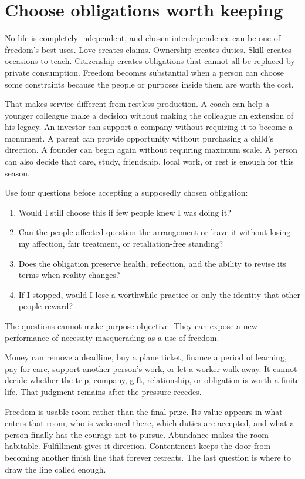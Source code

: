\section{Choose obligations worth keeping}

No life is completely independent, and chosen interdependence can be one of
freedom's best uses. Love creates claims. Ownership creates duties. Skill
creates occasions to teach. Citizenship creates obligations that cannot all be
replaced by private consumption. Freedom becomes substantial when a person can
choose some constraints because the people or purposes inside them are worth
the cost.

That makes service different from restless production. A coach can help a
younger colleague make a decision without making the colleague an extension
of his legacy. An investor can support a company without requiring it to
become a monument. A parent can provide opportunity without purchasing a
child's direction. A founder can begin again without requiring maximum scale.
A person can also decide that care, study, friendship, local work, or rest is
enough for this season.

Use four questions before accepting a supposedly chosen obligation:

\begin{enumerate}[itemsep=0.15em]
\item Would I still choose this if few people knew I was doing it?
\item Can the people affected question the arrangement or leave it without
  losing my affection, fair treatment, or retaliation-free standing?
\item Does the obligation preserve health, reflection, and the ability to
  revise its terms when reality changes?
\item If I stopped, would I lose a worthwhile practice or only the identity
  that other people reward?
\end{enumerate}

The questions cannot make purpose objective. They can expose a new performance
of necessity masquerading as a use of freedom.

Money can remove a deadline, buy a plane ticket, finance a period of learning,
pay for care, support another person's work, or let a worker walk away. It
cannot decide whether the trip, company, gift, relationship, or obligation is
worth a finite life. That judgment remains after the pressure recedes.

Freedom is usable room rather than the final prize. Its value appears in what
enters that room, who is welcomed there, which duties are accepted, and what a
person finally has the courage not to pursue. Abundance makes the room
habitable. Fulfillment gives it direction. Contentment keeps the door from
becoming another finish line that forever retreats. The last question is where
to draw the line called enough.
